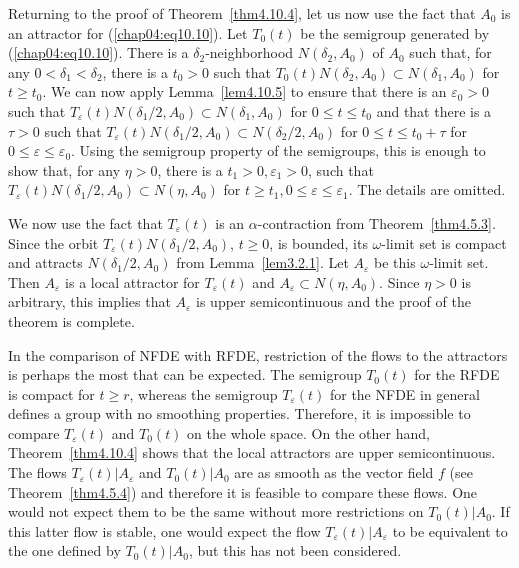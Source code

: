 \documentclass{surv-l}
\theoremstyle{plain}
\theoremstyle{definition}
\numberwithin{equation}{section}
\numberwithin{figure}{chapter}
\begin{document}
Returning to the proof of Theorem~\ref{thm4.10.4}, let us now use the fact that $A_{0}$ is an attractor for (\ref{chap04:eq10.10}). Let $T_{0}(t)$ be the semigroup generated by (\ref{chap04:eq10.10}). There is a $\delta_{2}$-neighborhood $N(\delta_{2}, A_{0})$ of $A_{0}$ such that, for any $0<\delta_{1}<\delta_{2}$, there is a $t_{0}>0$ such that $T_{0}(t)N(\delta_{2}, A_{0})\subset N(\delta_{1}, A_{0})$ for $t\geq t_{0}$. We can now apply Lemma~\ref{lem4.10.5} to ensure that there is an $\varepsilon_{0}>0$ such that $T_{\varepsilon}(t)N(\delta_{1}/2, A_{0})\subset N(\delta_{1}, A_{0})$ for $0\leq t\leq t_{0}$ and that there is a $\tau>0$ such that $T_{\varepsilon}(t)N(\delta_{1}/2, A_{0})\subset N(\delta_{2}/2, A_{0})$ for $ 0\leq t\leq t_{0}+\tau$ for $0\leq\varepsilon\leq\varepsilon_{0}$. Using the semigroup property of the semigroups, this is enough to show that, for any $\eta>0$, there is a $t_{1}>0, \varepsilon_{1}>0$, such that $T_{\varepsilon}(t)N(\delta_{1}/2, A_{0})\subset N(\eta, A_{0})$ for $t\geq t_{1},0\leq\varepsilon\leq\varepsilon_{1}$. The details are omitted.

We now use the fact that $T_{\varepsilon}(t)$ is an $\alpha$-contraction from Theorem~\ref{thm4.5.3}. Since the orbit $T_{\varepsilon}(t)N(\delta_{1}/2, A_{0})$, $t\geq 0$, is bounded, its $\omega$-limit set is compact and attracts $N(\delta_{1}/2, A_{0})$ from Lemma~\ref{lem3.2.1}. Let $A_{\varepsilon}$ be this $\omega$-limit set. Then $A_{\varepsilon}$ is a local attractor for $T_{\varepsilon}(t)$ and $A_{\varepsilon}\subset N(\eta, A_{0})$. Since $\eta>0$ is arbitrary, this implies that $A_{\varepsilon}$ is upper semicontinuous and the proof of the theorem is complete.

In the comparison of NFDE with RFDE, restriction of the flows to the attractors is perhaps the most that can be expected. The semigroup $T_{0}(t)$ for the RFDE is compact for $t\geq r$, whereas the semigroup $T_{\varepsilon}(t)$ for the NFDE in general defines a group with no smoothing properties. Therefore, it is impossible to compare $T_{\varepsilon}(t)$ and $T_{0}(t)$ on the whole space. On the other hand, Theorem~\ref{thm4.10.4} shows that the local attractors are upper semicontinuous. The flows $T_{\varepsilon}(t)|A_{\varepsilon}$ and $T_{0}(t)|A_{0}$ are as smooth as the vector field $f$ (see Theorem~\ref{thm4.5.4}) and therefore it is feasible to compare these flows. One would not expect them to be the same without more restrictions on $T_{0}(t)|A_{0}$. If this latter flow is stable, one would expect the flow $T_{\varepsilon}(t)|A_{\varepsilon}$ to be equivalent to the one defined by $T_{0}(t)|A_{0}$, but this has not been considered.
\end{document}
